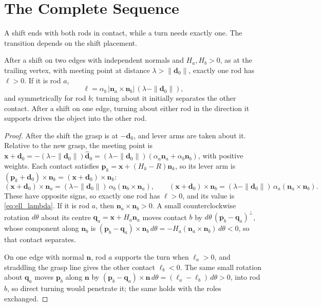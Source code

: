 \section{The Complete Sequence}
\label{sec:tworod}

A shift ends with both rods in contact, while a turn needs exactly one. The transition depends on the shift placement.

\begin{proposition}
\label{lem:separation}
After a shift on two edges with independent normals and $H_a,H_b>0$, as at the trailing vertex, with meeting point at distance $\lambda>\|\mathbf d_0\|$, exactly one rod has $\ell>0$. If it is rod $a$,
\begin{equation}
  \ell=\alpha_b\,|\mathbf n_a\times\mathbf n_b|\,(\lambda-\|\mathbf d_0\|),
  \label{eq:ell_lambda}
\end{equation}
and symmetrically for rod $b$; turning about it initially separates the other contact. After a shift on one edge, turning about either rod in the direction it supports drives the object into the other rod.
\end{proposition}
\begin{proof}
After the shift the grasp is at $-\mathbf d_0$, and lever arms are taken about it. Relative to the new grasp, the meeting point is $\mathbf x+\mathbf d_0=-(\lambda-\|\mathbf d_0\|)\hat{\mathbf d}_0=(\lambda-\|\mathbf d_0\|)(\alpha_a\mathbf n_a+\alpha_b\mathbf n_b)$, with positive weights. Each contact satisfies $\mathbf p_k=\mathbf x+(H_k-R)\mathbf n_k$, so its lever arm is $(\mathbf p_k+\mathbf d_0)\times\mathbf n_k=(\mathbf x+\mathbf d_0)\times\mathbf n_k$:
\[
 (\mathbf x+\mathbf d_0)\times\mathbf n_a=(\lambda-\|\mathbf d_0\|)\,\alpha_b(\mathbf n_b\times\mathbf n_a),\qquad
 (\mathbf x+\mathbf d_0)\times\mathbf n_b=(\lambda-\|\mathbf d_0\|)\,\alpha_a(\mathbf n_a\times\mathbf n_b).
\]
These have opposite signs, so exactly one rod has $\ell>0$, and its value is \eqref{eq:ell_lambda}. If it is rod $a$, then $\mathbf n_a\times\mathbf n_b>0$. A small counterclockwise rotation $d\theta$ about its centre $\mathbf q_a=\mathbf x+H_a\mathbf n_a$ moves contact $b$ by $d\theta\,(\mathbf p_b-\mathbf q_a)^\perp$, whose component along $\mathbf n_b$ is $(\mathbf p_b-\mathbf q_a)\times\mathbf n_b\,d\theta=-H_a(\mathbf n_a\times\mathbf n_b)\,d\theta<0$, so that contact separates.

On one edge with normal $\mathbf n$, rod $a$ supports the turn when $\ell_a>0$, and straddling the grasp line gives the other contact $\ell_b<0$. The same small rotation about $\mathbf q_a$ moves $\mathbf p_b$ along $\mathbf n$ by $(\mathbf p_b-\mathbf q_a)\times\mathbf n\,d\theta=(\ell_a-\ell_b)\,d\theta>0$, into rod $b$, so direct turning would penetrate it; the same holds with the roles exchanged.
\end{proof}


